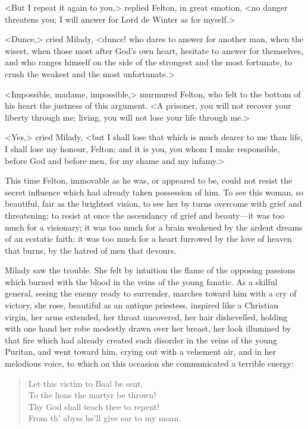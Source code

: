 <But I repeat it again to you,> replied Felton, in great emotion, <no danger threatens you; I will answer for Lord de Winter as for myself.> 

<Dunce,> cried Milady, <dunce! who dares to answer for another man, when the wisest, when those most after God's own heart, hesitate to answer for themselves, and who ranges himself on the side of the strongest and the most fortunate, to crush the weakest and the most unfortunate.> 

<Impossible, madame, impossible,> murmured Felton, who felt to the bottom of his heart the justness of this argument. <A prisoner, you will not recover your liberty through me; living, you will not lose your life through me.> 

<Yes,> cried Milady, <but I shall lose that which is much dearer to me than life, I shall lose my honour, Felton; and it is you, you whom I make responsible, before God and before men, for my shame and my infamy.> 

This time Felton, immovable as he was, or appeared to be, could not resist the secret influence which had already taken possession of him. To see this woman, so beautiful, fair as the brightest vision, to see her by turns overcome with grief and threatening; to resist at once the ascendancy of grief and beauty---it was too much for a visionary; it was too much for a brain weakened by the ardent dreams of an ecstatic faith; it was too much for a heart furrowed by the love of heaven that burns, by the hatred of men that devours. 

Milady saw the trouble. She felt by intuition the flame of the opposing passions which burned with the blood in the veins of the young fanatic. As a skilful general, seeing the enemy ready to surrender, marches toward him with a cry of victory, she rose, beautiful as an antique priestess, inspired like a Christian virgin, her arms extended, her throat uncovered, her hair dishevelled, holding with one hand her robe modestly drawn over her breast, her look illumined by that fire which had already created such disorder in the veins of the young Puritan, and went toward him, crying out with a vehement air, and in her melodious voice, to which on this occasion she communicated a terrible energy: 
\begin{verse}
Let this victim to Baal be sent,\\
To the lions the martyr be thrown!\\
Thy God shall teach thee to repent!\\
From th' abyss he'll give ear to my moan.
\end{verse}

